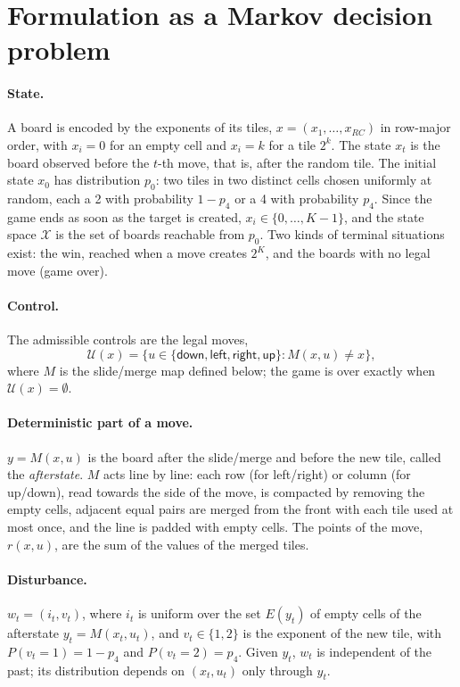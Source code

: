 \documentclass[11pt,a4paper]{article}
\theoremstyle{remark}
\newcommand{\X}{\mathcal{X}}
\newcommand{\U}{\mathcal{U}}
\newcommand{\act}[1]{\textsf{#1}}
\begin{document}
\section{Formulation as a Markov decision problem}

\paragraph{State.} A board is encoded by the exponents of its tiles, $x=(x_1,\dots,x_{RC})$ in row-major order, with $x_i=0$ for an empty cell and $x_i=k$ for a tile $2^k$. The state $x_t$ is the board observed before the $t$-th move, that is, after the random tile. The initial state $x_0$ has distribution $p_0$: two tiles in two distinct cells chosen uniformly at random, each a 2 with probability $1-p_4$ or a 4 with probability $p_4$. Since the game ends as soon as the target is created, $x_i\in\{0,\dots,K-1\}$, and the state space $\X$ is the set of boards reachable from $p_0$. Two kinds of terminal situations exist: the win, reached when a move creates $2^K$, and the boards with no legal move (game over).

\paragraph{Control.} The admissible controls are the legal moves,
\[
\U(x)=\bigl\{u\in\{\act{down},\act{left},\act{right},\act{up}\} : M(x,u)\neq x\bigr\},
\]
where $M$ is the slide/merge map defined below; the game is over exactly when $\U(x)=\emptyset$.

\paragraph{Deterministic part of a move.} $y=M(x,u)$ is the board after the slide/merge and before the new tile, called the \emph{afterstate}. $M$ acts line by line: each row (for \act{left}/\act{right}) or column (for \act{up}/\act{down}), read towards the side of the move, is compacted by removing the empty cells, adjacent equal pairs are merged from the front with each tile used at most once, and the line is padded with empty cells. The points of the move, $r(x,u)$, are the sum of the values of the merged tiles.

\paragraph{Disturbance.} $w_t=(i_t,v_t)$, where $i_t$ is uniform over the set $E(y_t)$ of empty cells of the afterstate $y_t=M(x_t,u_t)$, and $v_t\in\{1,2\}$ is the exponent of the new tile, with $P(v_t=1)=1-p_4$ and $P(v_t=2)=p_4$. Given $y_t$, $w_t$ is independent of the past; its distribution depends on $(x_t,u_t)$ only through $y_t$.
\end{document}
